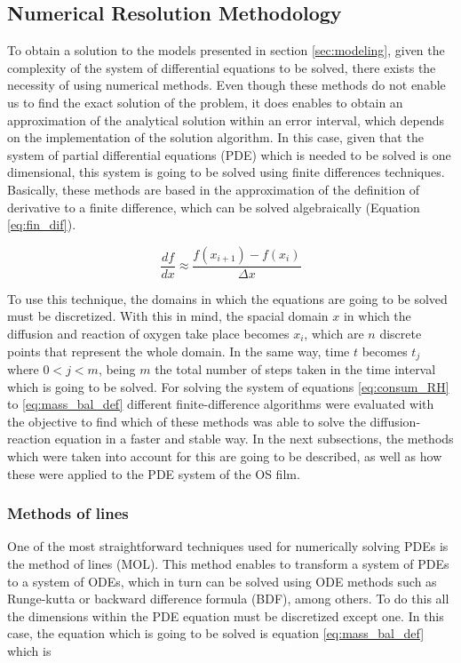 \begin{refsection}
\subsection{Numerical Resolution Methodology}\label{subsec:numerical_methodology.}
To obtain a solution to the models presented in section \ref{sec:modeling}, given the complexity of the system of differential equations to be solved, there exists the necessity of using numerical methods. Even though these methods do not enable us to find the exact solution of the problem, it does enables to obtain an approximation of the analytical solution within an error interval, which depends on the implementation of the solution algorithm. In this case, given that the system of partial differential equations (PDE) which is needed to be solved is one dimensional, this system is going to be solved using finite differences techniques. Basically, these methods are based in the approximation of the definition of derivative to a finite difference, which can be solved algebraically (Equation \ref{eq:fin_dif}).

\begin{equation}
    \frac{df}{dx}\approx \frac{f(x_{i+1})-f(x_{i}) }{\Delta x}
    \label{eq:fin_dif}
\end{equation}

To use this technique, the domains in which the equations are going to be solved must be discretized. With this in mind, the spacial domain $x$ in which the diffusion and reaction of oxygen take place becomes $x_i$, which are $n$ discrete points that represent the whole domain. In the same way, time $t$ becomes $t_j$ where $0<j<m$, being $m$ the total number of steps taken in the time interval which is going to be solved. For solving the  system of equations \ref{eq:consum_RH} to  \ref{eq:mass_bal_def}
different finite-difference algorithms were evaluated with the objective to find which of these methods was able to solve the diffusion-reaction equation in a faster and stable way. In the next subsections, the methods which were taken into account for this are going to be described, as well as how these were applied to the PDE system of the OS film. 

\subsubsection{Methods of lines}
One of the most straightforward techniques used for numerically solving PDEs is the method of lines (MOL). This method enables to transform a system of PDEs to a system of ODEs, which in turn can be solved using ODE methods such as Runge-kutta or backward difference formula (BDF), among others. To do this all the dimensions within the PDE equation must be discretized except one. In this case, the equation which is going to be solved is equation \ref{eq:mass_bal_def} which is 



\end{refsection}
